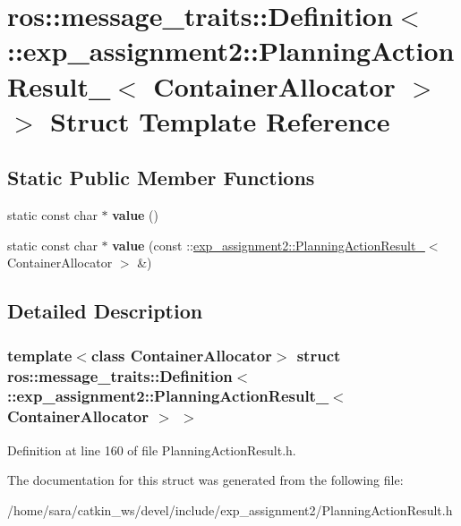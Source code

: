 \hypertarget{structros_1_1message__traits_1_1Definition_3_01_1_1exp__assignment2_1_1PlanningActionResult___3_01ContainerAllocator_01_4_01_4}{}\section{ros\+:\+:message\+\_\+traits\+:\+:Definition$<$ \+:\+:exp\+\_\+assignment2\+:\+:Planning\+Action\+Result\+\_\+$<$ Container\+Allocator $>$ $>$ Struct Template Reference}
\label{structros_1_1message__traits_1_1Definition_3_01_1_1exp__assignment2_1_1PlanningActionResult___3_01ContainerAllocator_01_4_01_4}
\subsection*{Static Public Member Functions}
\begin{DoxyCompactItemize}
\item 
\mbox{\label{structros_1_1message__traits_1_1Definition_3_01_1_1exp__assignment2_1_1PlanningActionResult___3_01ContainerAllocator_01_4_01_4_a4660840d1cebec7c4a8de7587f9e3607}} 
static const char $\ast$ {\bfseries value} ()
\item 
\mbox{\label{structros_1_1message__traits_1_1Definition_3_01_1_1exp__assignment2_1_1PlanningActionResult___3_01ContainerAllocator_01_4_01_4_ade54a9faada03f991e01f4913ceb2d94}} 
static const char $\ast$ {\bfseries value} (const \+::\hyperlink{structexp__assignment2_1_1PlanningActionResult__}{exp\+\_\+assignment2\+::\+Planning\+Action\+Result\+\_\+}$<$ Container\+Allocator $>$ \&)
\end{DoxyCompactItemize}


\subsection{Detailed Description}
\subsubsection*{template$<$class Container\+Allocator$>$\newline
struct ros\+::message\+\_\+traits\+::\+Definition$<$ \+::exp\+\_\+assignment2\+::\+Planning\+Action\+Result\+\_\+$<$ Container\+Allocator $>$ $>$}



Definition at line 160 of file Planning\+Action\+Result.\+h.



The documentation for this struct was generated from the following file\+:\begin{DoxyCompactItemize}
\item 
/home/sara/catkin\+\_\+ws/devel/include/exp\+\_\+assignment2/Planning\+Action\+Result.\+h\end{DoxyCompactItemize}
